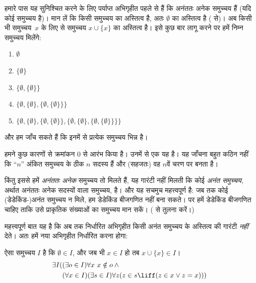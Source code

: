 \documentclass[../../../include/open-logic-section]{subfiles}
\begin{document}

हमारे पास यह सुनिश्चित करने के लिए पर्याप्त अभिगृहीत पहले से हैं कि अनंततः
अनेक समुच्चय हैं (यदि कोई समुच्चय है)। मान लें कि किसी समुच्चय का अस्तित्व
है, अतः $\emptyset$ का अस्तित्व है
( से)। अब किसी भी समुच्चय~$x$ के लिए
 से समुच्चय $x \cup \{x\}$
का अस्तित्व है। इसे कुछ बार लागू करने पर हमें निम्न समुच्चय मिलेंगे:
\begin{enumerate}
	\item[0.] $\emptyset$ %
	\item[1.] $ \{\emptyset\}$ %
	\item[2.] $\{\emptyset, \{\emptyset\}\}$ %
	\item[3.] $\{\emptyset, \{\emptyset\}, \{\emptyset, \{\emptyset\}\}\}$ %
	\item[4.] $\{\emptyset, \{\emptyset\}, \{\emptyset, \{\emptyset\}\}, \{\emptyset, \{\emptyset\}, \{\emptyset, \{\emptyset\}\}\}\}$%
\end{enumerate}
और हम जाँच सकते हैं कि इनमें से प्रत्येक समुच्चय भिन्न है।

हमने कुछ कारणों से क्रमांकन $0$ से आरंभ किया है। उनमें से एक यह है। यह
जाँचना बहुत कठिन नहीं कि ``$n$'' अंकित समुच्चय के ठीक $n$ सदस्य हैं और
(सहजतः) वह $n$वें चरण पर बनता है।

किंतु इससे हमें \emph{अनंततः अनेक} समुच्चय तो मिलते हैं, यह गारंटी नहीं
मिलती कि कोई \emph{अनंत समुच्चय}, अर्थात अनंततः अनेक सदस्यों वाला समुच्चय,
है। और यह सचमुच महत्त्वपूर्ण है: जब तक कोई (डेडेकिंड-)अनंत समुच्चय न मिले,
हम डेडेकिंड बीजगणित नहीं बना सकते। पर हमें डेडेकिंड बीजगणित चाहिए ताकि उसे
प्राकृतिक संख्याओं का समुच्चय मान सकें।
( से तुलना करें।)

महत्त्वपूर्ण बात यह है कि अब तक निर्धारित अभिगृहीत किसी अनंत समुच्चय के
अस्तित्व की गारंटी \emph{नहीं} देते। अतः हमें नया अभिगृहीत निर्धारित करना
होगा:

\begin{axiom}[अनंतता]
ऐसा समुच्चय $I$ है कि $\emptyset \in I$, और जब भी $x \in I$ हो तब
$x \cup \{x\} \in I$।
\begin{align*}
	\exists I( & (\exists o \in I)\forall x\ x \notin o \land {}\\
	& (\forall x \in I)(\exists s \in I)\forall z(z \in s \liff (z \in x \lor z = x)))
\end{align*}
\end{axiom}
\end{document}
